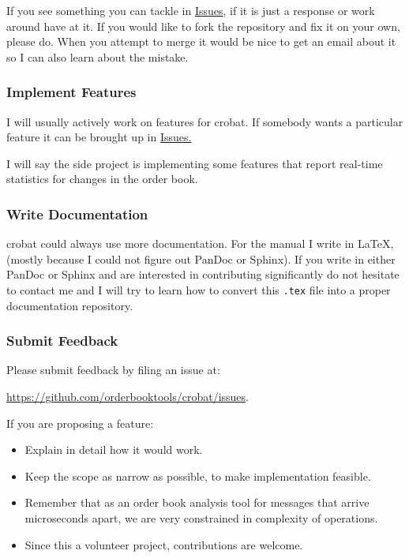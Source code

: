 \documentclass[refman]{article}
\begin{document}
 If you see something you can tackle in \href{https://github.com/orderbooktools/crobat/issues}{Issues}, if it is just a response or work around have at it. If you would like to fork the repository and fix it on your own, please do. When you attempt to merge it would be nice to get an email about it so I can also learn about the mistake. 
 
 \subsubsection{Implement Features}
 
 I will usually actively work on features for crobat. If somebody wants a particular feature it can be brought up in \href{https://github.com/orderbooktools/crobat/issues}{Issues.}
 \smallskip
 
 \noindent I will say the side project is implementing some features that report real-time statistics for changes in the order book.
 
 \subsubsection{Write Documentation}
 
 crobat could always use more documentation. For the manual I write in \LaTeX, (mostly because  I could not figure out PanDoc or Sphinx). If you write in either PanDoc or Sphinx and are interested in contributing significantly do not hesitate to contact me and I will try to learn how to convert this \texttt{.tex} file into a proper documentation repository.
 
 \subsubsection{Submit Feedback}
 
 Please submit feedback by filing an issue at:
 
 \noindent  \href{https://github.com/orderbooktools/crobat/issues}{https://github.com/orderbooktools/crobat/issues}.
 \smallskip
 
 \noindent If you are proposing a feature:\begin{itemize}
 	\item Explain in detail how it would work.
 	\item Keep the scope as narrow as possible, to make implementation feasible.
 	\item Remember that as an order book analysis tool for messages that arrive microseconds apart, we are very constrained in complexity of operations.
 	\item Since this a volunteer project, contributions are welcome.
 \end{itemize}
  
\end{document}
